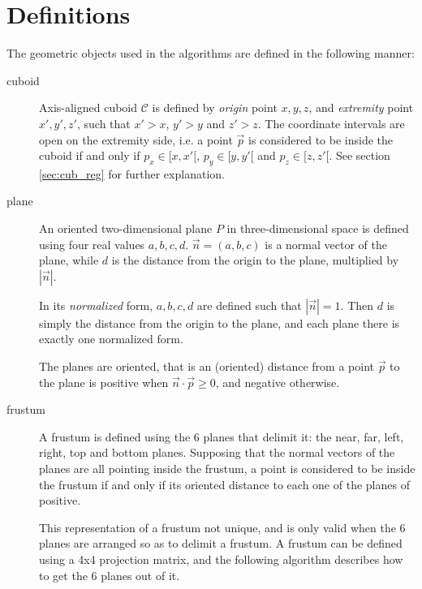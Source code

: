 \documentclass[a4paper,10pt,abstracton,notitlepage]{scrreprt}
\begin{document}
\section{Definitions}
The geometric objects used in the algorithms are defined in the following manner:
\begin{description}
\item[cuboid] Axis-aligned cuboid $\mathcal{C}$ is defined by \emph{origin} point $x, y, z$, and \emph{extremity} point $x', y', z'$, such that $x' > x$, $y' > y$ and $z' > z$. The coordinate intervals are open on the extremity side, i.e. a point $\overrightarrow{p}$ is considered to be inside the cuboid if and only if $p_{x} \in [x, x'[$, $p_{y} \in [y, y'[$ and $p_{z} \in [z, z'[$. See section \ref{sec:cub_reg} for further explanation.

\item[plane] An oriented two-dimensional plane $P$ in three-dimensional space is defined using four real values $a, b, c, d$. $\overrightarrow{n} = (a, b, c)$ is a normal vector of the plane, while $d$ is the distance from the origin to the plane, multiplied by $|\overrightarrow{n}|$.

In its \emph{normalized} form, $a, b, c, d$ are defined such that $|\overrightarrow{n}| = 1$. Then $d$ is simply the distance from the origin to the plane, and each plane there is exactly one normalized form.

The planes are oriented, that is an (oriented) distance from a point $\overrightarrow{p}$ to the plane is positive when $\overrightarrow{n} \cdot \overrightarrow{p} \geq 0$, and negative otherwise.

\item[frustum] A frustum is defined using the 6 planes that delimit it: the near, far, left, right, top and bottom planes. Supposing that the normal vectors of the planes are all pointing inside the frustum, a point is considered to be inside the frustum if and only if its oriented distance to each one of the planes of positive.

This representation of a frustum not unique, and is only valid when the 6 planes are arranged so as to delimit a frustum. A frustum can be defined using a 4x4 projection matrix, and the following algorithm describes how to get the 6 planes out of it.
\end{description}
\end{document}
